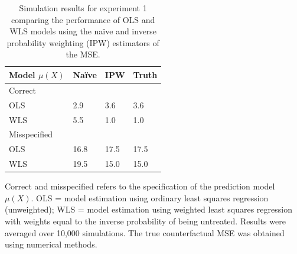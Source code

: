 \begin{table}[t]
    \centering
    \caption{Simulation results for experiment 1 comparing the performance of OLS and WLS models using the na\"{i}ve and inverse probability weighting (IPW) estimators of the MSE.}
    \begin{threeparttable}
        \begin{tabular}{p{3cm}R{1.25cm}R{1.25cm}R{1.25cm}}
        \toprule
        Model $\mu(X)$ & Na\"{i}ve & IPW & Truth  \\
        \midrule
        Correct & & & \\
        \hspace{1em}OLS & 2.9 & 3.6 & 3.6\\
        \hspace{1em}WLS & 5.5 & 1.0 & 1.0\\
        \addlinespace[0.25em]
        Misspecified & & & \\
        \hspace{1em}OLS & 16.8 & 17.5 & 17.5\\
        \hspace{1em}WLS & 19.5 & 15.0 & 15.0\\
        \bottomrule
        \end{tabular}
        \begin{tablenotes}
        \item \noindent Correct and misspecified refers to the specification of the  prediction model $\mu(X)$. OLS = model estimation using ordinary least squares regression (unweighted); WLS = model estimation using weighted least squares regression with weights equal to the inverse probability of being untreated. Results were averaged over 10,000 simulations. The true counterfactual MSE was obtained using numerical methods. 
        \end{tablenotes}
        \end{threeparttable}
    
\end{table}

